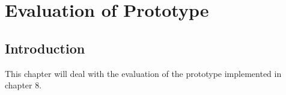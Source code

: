 \chapter{Evaluation of Prototype}
\section{Introduction}
This chapter will deal with the evaluation of the prototype implemented in chapter 8.

